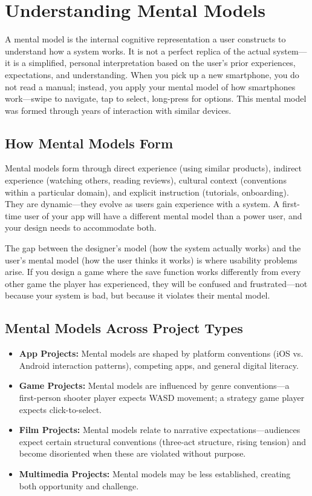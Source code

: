 \documentclass[12pt,a4paper]{article}
\begin{document}
\section*{Understanding Mental Models}
A mental model is the internal cognitive representation a user constructs to understand how a system works. It is not a perfect replica of the actual system—it is a simplified, personal interpretation based on the user’s prior experiences, expectations, and understanding. When you pick up a new smartphone, you do not read a manual; instead, you apply your mental model of how smartphones work—swipe to navigate, tap to select, long-press for options. This mental model was formed through years of interaction with similar devices.

\subsection*{How Mental Models Form}
Mental models form through direct experience (using similar products), indirect experience (watching others, reading reviews), cultural context (conventions within a particular domain), and explicit instruction (tutorials, onboarding). They are dynamic—they evolve as users gain experience with a system. A first-time user of your app will have a different mental model than a power user, and your design needs to accommodate both.

The gap between the designer’s model (how the system actually works) and the user’s mental model (how the user thinks it works) is where usability problems arise. If you design a game where the save function works differently from every other game the player has experienced, they will be confused and frustrated—not because your system is bad, but because it violates their mental model.

\subsection*{Mental Models Across Project Types}
\begin{itemize}
    \item \textbf{App Projects:} Mental models are shaped by platform conventions (iOS vs. Android interaction patterns), competing apps, and general digital literacy.
    \item \textbf{Game Projects:} Mental models are influenced by genre conventions—a first-person shooter player expects WASD movement; a strategy game player expects click-to-select.
    \item \textbf{Film Projects:} Mental models relate to narrative expectations—audiences expect certain structural conventions (three-act structure, rising tension) and become disoriented when these are violated without purpose.
    \item \textbf{Multimedia Projects:} Mental models may be less established, creating both opportunity and challenge.
\end{itemize}
\end{document}

